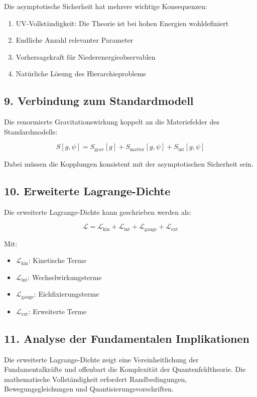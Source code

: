 \documentclass{article}
\begin{document}
Die asymptotische Sicherheit hat mehrere wichtige Konsequenzen:

\begin{enumerate}
	\item UV-Vollständigkeit: Die Theorie ist bei hohen Energien wohldefiniert
	\item Endliche Anzahl relevanter Parameter
	\item Vorhersagekraft für Niederenergieobservablen
	\item Natürliche Lösung des Hierarchieproblems
\end{enumerate}

\subsection{9. Verbindung zum Standardmodell}

Die renormierte Gravitationswirkung koppelt an die Materiefelder des Standardmodells:

\[
S[g,\psi] = S_\text{grav}[g] + S_\text{matter}[g,\psi] + S_\text{int}[g,\psi]
\]

Dabei müssen die Kopplungen konsistent mit der asymptotischen Sicherheit sein.

\subsection{10. Erweiterte Lagrange-Dichte}

Die erweiterte Lagrange-Dichte kann geschrieben werden als:

\[
\mathcal{L} = \mathcal{L}_\text{kin} + \mathcal{L}_\text{int} + \mathcal{L}_\text{gauge} + \mathcal{L}_\text{ext}
\]

Mit:

\begin{itemize}
	\item $\mathcal{L}_\text{kin}$: Kinetische Terme
	\item $\mathcal{L}_\text{int}$: Wechselwirkungsterme
	\item $\mathcal{L}_\text{gauge}$: Eichfixierungsterme
	\item $\mathcal{L}_\text{ext}$: Erweiterte Terme
\end{itemize}

\subsection{11. Analyse der Fundamentalen Implikationen}

Die erweiterte Lagrange-Dichte zeigt eine Vereinheitlichung der Fundamentalkräfte und offenbart die Komplexität der Quantenfeldtheorie. Die mathematische Vollständigkeit erfordert Randbedingungen, Bewegungsgleichungen und Quantisierungsvorschriften.
\end{document}
